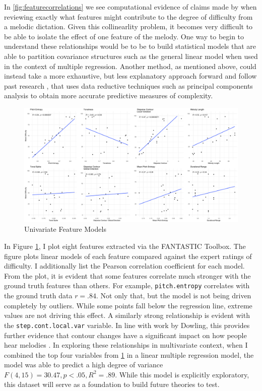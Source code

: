 \documentclass[12pt,]{book}
\begin{document}
In \ref{fig:featurecorrelations} we see computational evidence of claims made by \citet{taylorStrategiesMemoryShort1983} when reviewing exactly what features might contribute to the degree of difficulty from a melodic dictation.
Given this collinearlity problem, it becomes very difficult to be able to isolate the effect of one feature of the melody.
One way to begin to understand these relationships would be to be to build statistical models that are able to partition covariance structures such as the general linear model when used in the context of multiple regression.
Another method, as mentioned above, could instead take a more exhaustive, but less explanatory approach forward and follow past research \citep{bakerPerceptionLeitmotivesRichard2017, harrisonModellingMelodicDiscrimination2016}, that uses data reductive techniques such as principal components analysis to obtain more accurate predictive measures of complexity.

\begin{figure}

{\centering \includegraphics[width=1\linewidth]{img/univariate_cow} 

}

\caption{Univariate Feature Models}\label{fig:univariatecow}
\end{figure}

In Figure \ref{fig:univariatecow}, I plot eight features extracted via the FANTASTIC Toolbox.
The figure plots linear models of each feature compared against the expert ratings of difficulty.
I additionally list the Pearson correlation coefficient for each model.
From the plot, it is evident that some features correlate much stronger with the ground truth features than others.
For example, \texttt{pitch.entropy} correlates with the ground truth data \(r = .84\).
Not only that, but the model is not being driven completely by outliers.
While some points fall below the regression line, extreme values are not driving this effect.
A similarly strong relationship is evident with the \texttt{step.cont.local.var} variable.
In line with work by Dowling, this provides further evidence that contour changes have a significant impact on how people hear melodies \citep{dowlingScaleContourTwo1978}.
In exploring these relationships in multivariate context, when I combined the top four variables from \ref{fig:univariatecow} in a linear multiple regression model, the model was able to predict a high degree of variance \(F(4,15) = 30.47, p < .05, R^2 = .89\).
While this model is explicitly exploratory, this dataset will serve as a foundation to build future theories to test.
\end{document}
